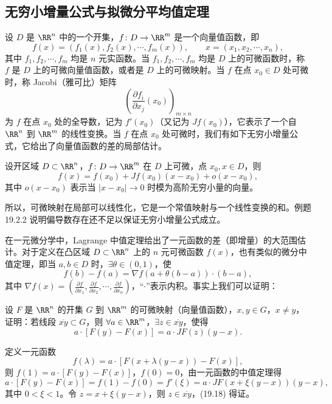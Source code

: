 \subsection{无穷小增量公式与拟微分平均值定理}

设 $D$ 是 $\RR^n$ 中的一个开集，$f\colon D\to\RR^m$ 是一个向量值函数，即
\[
  f(x)=(f_1(x),f_2(x),\cdots,f_m(x)),\qquad x=(x_1,x_2,\cdots,x_n),
\]
其中 $f_1,f_2,\cdots,f_m$ 均是 $n$ 元实函数。当 $f_1,f_2,\cdots,f_m$ 均是 $D$ 上的可微函数时，称 $f$ 是 $D$ 上的可微向量值函数，或者是 $D$ 上的可微映射。当 $f$ 在点 $x_0\in D$ 处可微时，称 Jacobi（雅可比）矩阵
\[
  \left(\frac{\partial f_i}{\partial x_j}(x_0)\right)_{m\times n}
\]
为 $f$ 在点 $x_0$ 处的全导数，记为 $f'(x_0)$（又记为 $Jf(x_0)$），它表示了一个自 $\RR^n$ 到 $\RR^m$ 的线性变换。当 $f$ 在点 $x_0$ 处可微时，我们有如下无穷小增量公式，它给出了向量值函数的差的局部估计。

\begin{xproposition}[19.4.1]
设开区域 $D\subset\RR^n$，$f\colon D\to\RR^m$ 在 $D$ 上可微，点 $x_0,x\in D$，则
\[
  f(x)=f(x_0)+Jf(x_0)(x-x_0)+o(x-x_0),
\]
其中 $o(x-x_0)$ 表示当 $|x-x_0|\to0$ 时模为高阶无穷小量的向量。
\end{xproposition}

所以，可微映射在局部可以线性化，它是一个常值映射与一个线性变换的和。例题 19.2.2 说明偏导数存在还不足以保证无穷小增量公式成立。

在一元微分学中，Lagrange 中值定理给出了一元函数的差（即增量）的大范围估计。对于定义在凸区域 $D\subset\RR^n$ 上的 $n$ 元可微函数 $f(x)$，也有类似的微分中值定理，即当 $a,b\in D$ 时，$\exists\theta\in(0,1)$，使
\[
  f(b)-f(a)=\nabla f(a+\theta(b-a))\cdot(b-a),
\]
其中 $\nabla f(x)=\left(\frac{\partial f}{\partial x_1},\frac{\partial f}{\partial x_2},\cdots,\frac{\partial f}{\partial x_n}\right)$，“$\cdot$”表示内积。事实上我们可以证明：

\begin{xexample}[19.4.1]
设 $F$ 是 $\RR^n$ 的开集 $G$ 到 $\RR^m$ 的可微映射（向量值函数），$x,y\in G$，$x\ne y$，证明：若线段 $\overline{xy}\subset G$，则 $\forall a\in\RR^m$，$\exists z\in\overline{xy}$，使得
\begin{equation}
  a\cdot[F(y)-F(x)]=a\cdot JF(z)(y-x).
  \tag{19.18}
\end{equation}
\end{xexample}
\begin{xproof}
定义一元函数
\[
  f(\lambda)=a\cdot[F(x+\lambda(y-x))-F(x)],
\]
则 $f(1)=a\cdot[F(y)-F(x)]$，$f(0)=0$，由一元函数的中值定理得
\[
  a\cdot[F(y)-F(x)]=f(1)-f(0)=f'(\xi)=a\cdot JF(x+\xi(y-x))(y-x),
\]
其中 $0<\xi<1$。令 $z=x+\xi(y-x)$，则 $z\in\overline{xy}$，(19.18) 得证。
\end{xproof}

